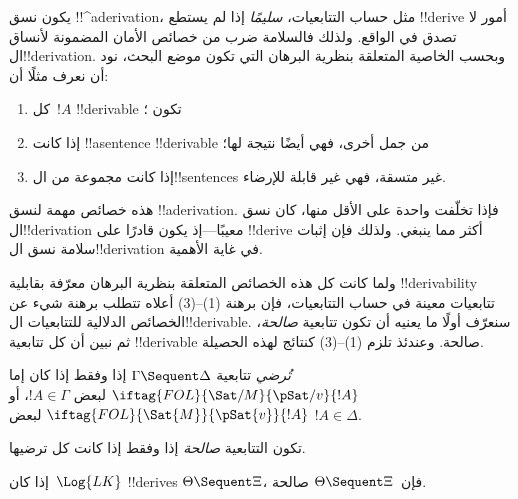 \documentclass[../../../include/open-logic-section]{subfiles}
\begin{document}
      {}
      {}


\begin{explain}
يكون نسق !!^a{derivation}، مثل حساب التتابعيات، \emph{سليمًا} إذا لم
يستطع !!{derive} أمور لا تصدق في الواقع. ولذلك فالسلامة ضرب من خصائص
الأمان المضمونة لأنساق ال!!{derivation}. وبحسب الخاصية المتعلقة بنظرية
البرهان التي تكون موضع البحث، نود أن نعرف مثلًا أن:
\begin{enumerate}
\item كل~$!A$ !!{derivable} تكون ؛
\item إذا كانت !!a{sentence} !!{derivable} من جمل أخرى، فهي أيضًا
  نتيجة لها؛
\item إذا كانت مجموعة من ال!!{sentence}s غير متسقة، فهي غير قابلة
  للإرضاء.
\end{enumerate}
هذه خصائص مهمة لنسق !!a{derivation}. فإذا تخلّفت واحدة على الأقل منها، كان نسق
ال!!{derivation} معيبًا---إذ يكون قادرًا على !!{derive} أكثر مما ينبغي.
ولذلك فإن إثبات سلامة نسق ال!!{derivation} في غاية الأهمية.

ولما كانت كل هذه الخصائص المتعلقة بنظرية البرهان معرّفة بقابلية
!!{derivability} تتابعيات معينة في حساب التتابعيات، فإن برهنة
(1)--(3) أعلاه تتطلب برهنة شيء عن الخصائص الدلالية للتتابعيات
ال!!{derivable}. سنعرّف أولًا ما يعنيه أن تكون تتابعية \emph{صالحة}،
ثم نبين أن كل تتابعية !!{derivable} صالحة. وعندئذ تلزم (1)--(3)
كنتائج لهذه الحصيلة.
\end{explain}

\begin{defn}
 \emph{تُرضي} تتابعية
$\Gamma \Sequent \Delta$ إذا وفقط إذا كان إما
$\iftag{FOL}{\Sat/{M}}{\pSat/{v}}{!A}$ لبعض $!A \in \Gamma$، أو
$\iftag{FOL}{\Sat{M}}{\pSat{v}}{!A}$ لبعض $!A \in \Delta$.

تكون التتابعية \emph{صالحة} إذا وفقط إذا كانت كل
ترضيها.
\end{defn}

\begin{thm}[السلامة]
 إذا كان~$\Log{LK}$ !!{derive}s
$\Theta \Sequent \Xi$، فإن~$\Theta \Sequent \Xi$ صالحة.
\end{thm}
\end{document}
